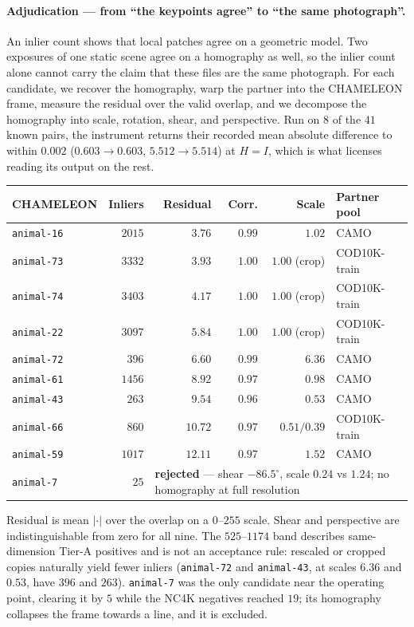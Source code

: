 \documentclass{article}
\begin{document}
\paragraph{Adjudication --- from ``the keypoints agree'' to ``the same photograph''.} An inlier count
shows that local patches agree on a geometric model. Two exposures of one static scene agree on a
homography as well, so the inlier count alone cannot carry the claim that these files are the same
photograph. For each candidate, we recover the homography, warp the partner into the CHAMELEON frame, measure the residual over the valid overlap, and we decompose the homography into scale,
rotation, shear, and perspective. Run on $8$ of the $41$ known pairs, the instrument returns their
recorded mean absolute difference to within $0.002$ ($0.603 \to 0.603$, $5.512 \to 5.514$) at
$H = I$, which is what licenses reading its output on the rest.

\begin{center}\small
\setlength{\tabcolsep}{4pt}
\begin{tabular}{lrrrrl}
\toprule
CHAMELEON & Inliers & Residual & Corr. & Scale & Partner pool \\
\midrule
\texttt{animal-16} & $2015$ & $3.76$ & $0.99$ & $1.02$ & CAMO \\
\texttt{animal-73} & $3332$ & $3.93$ & $1.00$ & $1.00$ (crop) & COD10K-train \\
\texttt{animal-74} & $3403$ & $4.17$ & $1.00$ & $1.00$ (crop) & COD10K-train \\
\texttt{animal-22} & $3097$ & $5.84$ & $1.00$ & $1.00$ (crop) & COD10K-train \\
\texttt{animal-72} & $396$ & $6.60$ & $0.99$ & $6.36$ & CAMO \\
\texttt{animal-61} & $1456$ & $8.92$ & $0.97$ & $0.98$ & CAMO \\
\texttt{animal-43} & $263$ & $9.54$ & $0.96$ & $0.53$ & CAMO \\
\texttt{animal-66} & $860$ & $10.72$ & $0.97$ & $0.51/0.39$ & COD10K-train \\
\texttt{animal-59} & $1017$ & $12.11$ & $0.97$ & $1.52$ & CAMO \\
\midrule
\texttt{animal-7} & $25$ & \multicolumn{4}{l}{\textbf{rejected} --- shear $-86.5^\circ$, scale $0.24$ vs $1.24$; no homography at full resolution} \\
\bottomrule
\end{tabular}
\end{center}

Residual is mean $|{\cdot}|$ over the overlap on a $0$--$255$ scale. Shear and perspective are
indistinguishable from zero for all nine. The $525$--$1174$ band describes same-dimension Tier-A
positives and is not an acceptance rule: rescaled or cropped copies naturally yield fewer inliers
(\texttt{animal-72} and \texttt{animal-43}, at scales $6.36$ and $0.53$, have $396$ and $263$).
\texttt{animal-7} was the only candidate near the operating point, clearing it by $5$ while the NC4K
negatives reached $19$; its homography collapses the frame towards a line, and it is excluded.
\end{document}
